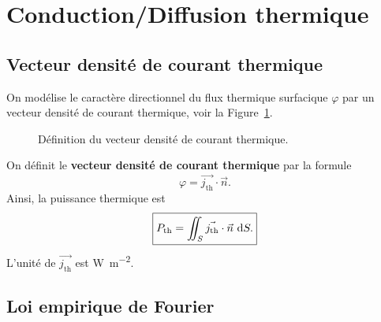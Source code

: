 \section{Conduction/Diffusion thermique}

    \subsection{Vecteur densité de courant thermique}

        On modélise le caractère directionnel du flux thermique surfacique $\varphi$ par un vecteur densité de courant thermique, voir la Figure~\ref{fig:vecteur_densite_courant_thermique}.

        \begin{figure}
            \centering
            \caption{Définition du vecteur densité de courant thermique.}    
            \label{fig:vecteur_densite_courant_thermique}
        \end{figure}

        \begin{definition}
            On définit le \textbf{vecteur densité de courant thermique} par la formule
            \begin{equation}
                \varphi=\vec{j_{\text{th}}}\cdot\vec{n}.
            \end{equation}
            Ainsi, la puissance thermique est
            \begin{equation}
                \boxed{
                    P_{\text{th}}=\iint_{S}\vec{j_{\text{th}}}\cdot\vec{n}~\mathrm{d} S.
                }
            \end{equation}
            L'unité de $\vec{j_{\text{th}}}$ est \si{\watt\per\metre\squared}.
        \end{definition}

    \subsection{Loi empirique de Fourier}

